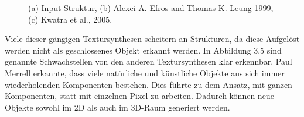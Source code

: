 \documentclass[12pt, a4paper,twoside,openright]{report} %
\begin{document}
\begin{figure}[H]
    \centering
    \qquad
    \qquad
    \caption{(a) Input Struktur, (b) Alexei A. Efros and Thomas K. Leung 1999, (c) Kwatra et al., 2005. \cite{merrell2009model}}%
\end{figure}

Viele dieser gängigen Textursynthesen scheitern an Strukturen, da diese Aufgelöst werden nicht als geschlossenes Objekt erkannt werden.
In Abbildung 3.5 sind genannte Schwachstellen von den anderen Textursynthesen klar erkennbar.
\newline
Paul Merrell erkannte, dass viele natürliche und künstliche Objekte aus sich immer wiederholenden Komponenten bestehen.
Dies führte zu dem Ansatz, mit ganzen Komponenten, statt mit einzelnen Pixel zu arbeiten.
Dadurch können neue Objekte sowohl im 2D als auch im 3D-Raum generiert werden. \cite{merrell2009model}
\end{document}
